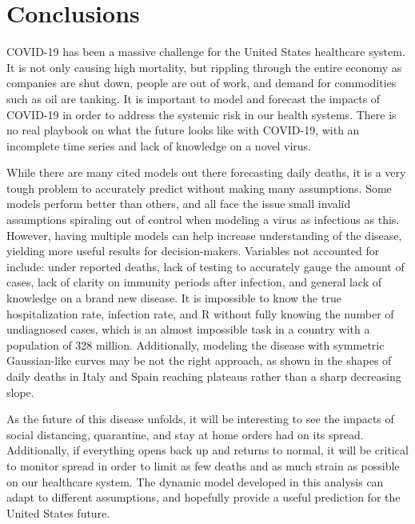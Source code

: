 \section{Conclusions}
\graphicspath{{Figures/}{../Figures/}}


COVID-19 has been a massive challenge for the United States healthcare system.  It is not only causing high mortality, but rippling through the entire economy as companies are shut down, people are out of work, and demand for commodities such as oil are tanking.  It is important to model and forecast the impacts of COVID-19 in order to address the systemic risk in our health systems.  There is no real playbook on what the future looks like with COVID-19, with an incomplete time series and lack of knowledge on a novel virus.

While there are many cited models out there forecasting daily deaths, it is a very tough problem to accurately predict without making many assumptions.  Some models perform better than others, and all face the issue small invalid assumptions spiraling out of control when modeling a virus as infectious as this.   However, having multiple models can help increase understanding of the disease, yielding more useful results for decision-makers. Variables not accounted for include:  under reported deaths, lack of testing to accurately gauge the amount of cases, lack of clarity on immunity periods after infection, and general lack of knowledge on a brand new disease.  It is impossible to know the true hospitalization rate, infection rate, and R without fully knowing the number of undiagnosed cases, which is an almost impossible task in a country with a population of 328 million. Additionally, modeling the disease with symmetric Gaussian-like curves may be not the right approach, as shown in the shapes of daily deaths in Italy and Spain reaching plateaus rather than a sharp decreasing slope.

As the future of this disease unfolds, it will be interesting to see the impacts of social distancing, quarantine, and stay at home orders had on its spread.  Additionally, if everything opens back up and returns to normal, it will be critical to monitor spread in order to limit as few deaths and as much strain as possible on our healthcare system.  The dynamic model developed in this analysis can adapt to different assumptions, and hopefully provide a useful prediction for the United States future.







